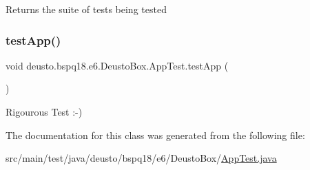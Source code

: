 \begin{DoxyReturn}{Returns}
the suite of tests being tested 
\end{DoxyReturn}
\mbox{\label{classdeusto_1_1bspq18_1_1e6_1_1_deusto_box_1_1_app_test_a9928f1fed754302ca8ef4ee297c6affd}} 
\subsubsection{\texorpdfstring{test\+App()}{testApp()}}
{\footnotesize\ttfamily void deusto.\+bspq18.\+e6.\+Deusto\+Box.\+App\+Test.\+test\+App (\begin{DoxyParamCaption}{ }\end{DoxyParamCaption})}

Rigourous Test \+:-\/) 

The documentation for this class was generated from the following file\+:\begin{DoxyCompactItemize}
\item 
src/main/test/java/deusto/bspq18/e6/\+Deusto\+Box/\mbox{\hyperlink{_app_test_8java}{App\+Test.\+java}}\end{DoxyCompactItemize}
